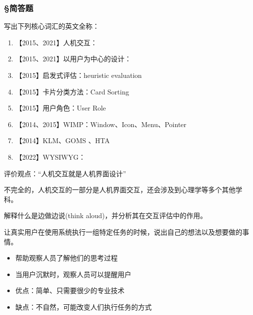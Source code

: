 \subsubsection*{\S 简答题}
\setcounter{problemname}{0}

\begin{problem}
写出下列核心词汇的英文全称：
\begin{enumerate}[label=(\arabic*)]
    \item 【2015、2021】人机交互：
    \item 【2015、2021】以用户为中心的设计：
    \item 【2015】启发式评估：heuristic evaluation
    \item 【2015】卡片分类方法：Card Sorting
    \item 【2015】用户角色：User Role
    \item 【2014、2015】WIMP：Window、Icon、Menu、Pointer
    \item 【2014】KLM、GOMS 、HTA
    \item 【2022】WYSIWYG：
\end{enumerate}
\end{problem}
\vspace{0.25em}


\begin{problem}[2015]
评价观点：“人机交互就是人机界面设计”
\end{problem}

\begin{solution}
不完全的，人机交互的一部分是人机界面交互，还会涉及到心理学等多个其他学科。
\end{solution}



\begin{problem}[2015、2016]
解释什么是边做边说(think aloud)，并分析其在交互评估中的作用。
\end{problem}

\begin{solution}
让真实用户在使用系统执行一组特定任务的时候，说出自己的想法以及想要做的事情。

\vspace{-0.8em}
\begin{multicols}{2}
    \begin{itemize}
        \item 帮助观察人员了解他们的思考过程
        \item 当用户沉默时，观察人员可以提醒用户
        \item 优点：简单、只需要很少的专业技术
        \item 缺点：不自然，可能改变人们执行任务的方式
    \end{itemize}
\end{multicols}
\vspace{-1em}
\end{solution}




